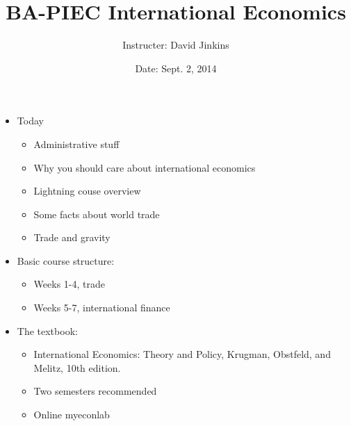 \documentclass[ignorenonframetext,]{beamer}
\title{BA-PIEC International Economics}
\author{Instructer: David Jinkins}
\date{Date: Sept. 2, 2014}
\begin{document}
\frame{\titlepage}

\begin{frame}

\begin{itemize}
\itemsep1pt\parskip0pt
\item
  Today

  \begin{itemize}
  \itemsep1pt\parskip0pt
  \item
        Administrative stuff
  \item
        Why you should care about international economics
  \item
        Lightning couse overview
  \item
        Some facts about world trade
  \item
        Trade and gravity
  \end{itemize}
\end{itemize}

\end{frame}

\begin{frame}

\begin{itemize}
\itemsep1pt\parskip0pt
\item
  Basic course structure:

  \begin{itemize}
  \itemsep1pt\parskip0pt
  \item
    Weeks 1-4, trade
  \item
    Weeks 5-7, international finance
  \end{itemize}
\end{itemize}

\end{frame}

\begin{frame}

\begin{itemize}
\itemsep1pt\parskip0pt
\item
  The textbook:

  \begin{itemize}
  \itemsep1pt\parskip0pt
  \item
    International Economics: Theory and Policy, Krugman, Obstfeld, and
    Melitz, 10th edition.
  \item
    Two semesters recommended
  \item
    Online myeconlab
  \end{itemize}
\end{itemize}

\end{frame}
\end{document}
